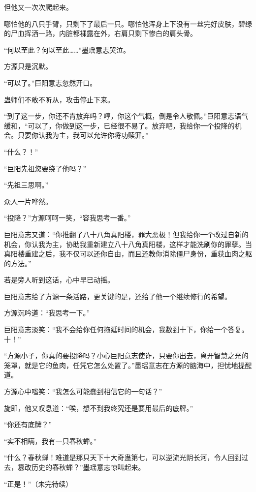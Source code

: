 \begin{this_body}
但他又一次次爬起来。

哪怕他的八只手臂，只剩下了最后一只。哪怕他浑身上下没有一丝完好皮肤，碧绿的尸血挥洒一路，内脏都裸露在外，右肩只剩下惨白的肩头骨。

“何以至此？何以至此……”墨瑶意志哭泣。

方源只是沉默。

“可以了。”巨阳意志忽然开口。

蛊师们不敢不听从，攻击停止下来。

“到了这一步，你还不肯放弃吗？哼，你这个气概，倒是令人敬佩。”巨阳意志语气缓和，“可以了，你做到这一步，已经很不易了。放弃吧，我给你一个投降的机会。只要你认我为主，我可以允许你将功赎罪。”

“什么？！”

“巨阳先祖您要绕了他吗？”

“先祖三思啊。”

众人一片哗然。

“投降？”方源呵呵一笑，“容我思考一番。”

巨阳意志又道：“你推翻了八十八角真阳楼，罪大恶极！但我给你一个改过自新的机会，你认我为主，协助我重新建立八十八角真阳楼，这样才能洗刷你的罪孽。当真阳楼重建之后，我不仅可以还你自由，而且还教你消除僵尸身份，重获血肉之躯的方法。”

若是旁人听到这话，心中早已动摇。

巨阳意志给了方源一条活路，更关键的是，还给了他一个继续修行的希望。

方源沉吟道：“我思考一下。”

巨阳意志淡笑：“我不会给你任何拖延时间的机会，我数到十下，你给一个答复。十！”

“方源小子，你真的要投降吗？小心巨阳意志使诈，只要你出去，离开智慧之光的笼罩，就是它的鱼肉，任凭它怎么处置了。”墨瑶意志在方源的脑海中，担忧地提醒道。

方源心中嗤笑：“我怎么可能蠢到相信它的一句话？”

旋即，他又叹息道：“唉，想不到我终究还是要用最后的底牌。”

“你还有底牌？”

“实不相瞒，我有一只春秋蝉。”

“什么？春秋蝉！难道是那只天下十大奇蛊第七，可以逆流光阴长河，令人回到过去，篡改历史的春秋蝉？”墨瑶意志惊叫起来。

“正是！”（未完待续）

\end{this_body}

